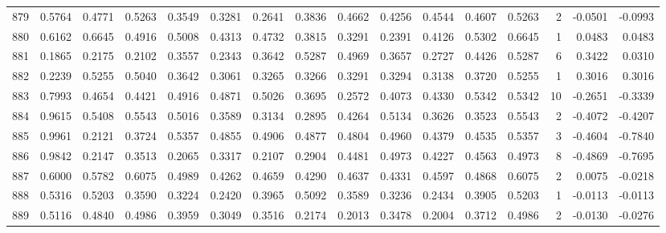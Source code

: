 \begin{tabular}{lrrrrrrrrrrrrrrr}
879 &      0.5764 &  0.4771 &  0.5263 &  0.3549 &  0.3281 &  0.2641 &  0.3836 &  0.4662 &  0.4256 &  0.4544 &   0.4607 &     0.5263 &      2 &                   -0.0501 &                    -0.0993 \\
880 &      0.6162 &  0.6645 &  0.4916 &  0.5008 &  0.4313 &  0.4732 &  0.3815 &  0.3291 &  0.2391 &  0.4126 &   0.5302 &     0.6645 &      1 &                    0.0483 &                     0.0483 \\
881 &      0.1865 &  0.2175 &  0.2102 &  0.3557 &  0.2343 &  0.3642 &  0.5287 &  0.4969 &  0.3657 &  0.2727 &   0.4426 &     0.5287 &      6 &                    0.3422 &                     0.0310 \\
882 &      0.2239 &  0.5255 &  0.5040 &  0.3642 &  0.3061 &  0.3265 &  0.3266 &  0.3291 &  0.3294 &  0.3138 &   0.3720 &     0.5255 &      1 &                    0.3016 &                     0.3016 \\
883 &      0.7993 &  0.4654 &  0.4421 &  0.4916 &  0.4871 &  0.5026 &  0.3695 &  0.2572 &  0.4073 &  0.4330 &   0.5342 &     0.5342 &     10 &                   -0.2651 &                    -0.3339 \\
884 &      0.9615 &  0.5408 &  0.5543 &  0.5016 &  0.3589 &  0.3134 &  0.2895 &  0.4264 &  0.5134 &  0.3626 &   0.3523 &     0.5543 &      2 &                   -0.4072 &                    -0.4207 \\
885 &      0.9961 &  0.2121 &  0.3724 &  0.5357 &  0.4855 &  0.4906 &  0.4877 &  0.4804 &  0.4960 &  0.4379 &   0.4535 &     0.5357 &      3 &                   -0.4604 &                    -0.7840 \\
886 &      0.9842 &  0.2147 &  0.3513 &  0.2065 &  0.3317 &  0.2107 &  0.2904 &  0.4481 &  0.4973 &  0.4227 &   0.4563 &     0.4973 &      8 &                   -0.4869 &                    -0.7695 \\
887 &      0.6000 &  0.5782 &  0.6075 &  0.4989 &  0.4262 &  0.4659 &  0.4290 &  0.4637 &  0.4331 &  0.4597 &   0.4868 &     0.6075 &      2 &                    0.0075 &                    -0.0218 \\
888 &      0.5316 &  0.5203 &  0.3590 &  0.3224 &  0.2420 &  0.3965 &  0.5092 &  0.3589 &  0.3236 &  0.2434 &   0.3905 &     0.5203 &      1 &                   -0.0113 &                    -0.0113 \\
889 &      0.5116 &  0.4840 &  0.4986 &  0.3959 &  0.3049 &  0.3516 &  0.2174 &  0.2013 &  0.3478 &  0.2004 &   0.3712 &     0.4986 &      2 &                   -0.0130 &                    -0.0276 \\

\end{tabular}
